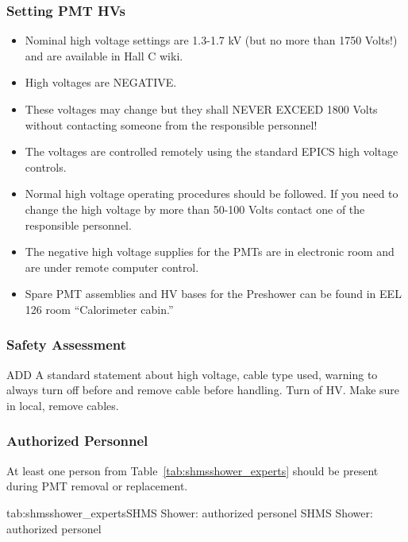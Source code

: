 {\subsubsection*{Setting PMT HVs}
\begin{itemize}
\item Nominal high voltage settings are 1.3-1.7 kV (but no more than
  1750 Volts!)  and are available in Hall C wiki.
\item High voltages are NEGATIVE. 
\item These voltages may change but they shall NEVER EXCEED 1800 Volts
  without contacting someone from the responsible personnel!
\item The voltages are controlled remotely using the standard EPICS high voltage controls.
\item Normal high voltage operating procedures should be followed. If
  you need to change the high voltage by more than 50-100 Volts
  contact one of the responsible personnel.
\item The negative high voltage supplies for the PMTs are in
  electronic room and are under remote computer control.
\item Spare PMT assemblies and HV bases for the Preshower can be
  found in EEL 126 room ``Calorimeter cabin.''
\end{itemize}

\begin{safetyen}{0}{0}

\subsubsection{Safety Assessment}

ADD A standard statement about high voltage, cable type used, warning
to always turn off before and remove cable before handling.  
Turn of HV.  Make sure in local, remove cables.


\subsubsection{Authorized Personnel}
At least one person from Table~\ref{tab:shmsshower_experts} should be
present during PMT removal or replacement.

\begin{namestab}{tab:shmsshower_experts}{SHMS Shower: authorized personel}{
    SHMS Shower: authorized personel}
  \ArshakAsaturyan{}
  \VardanTadevosyan{}
  \HamletMkrtchyan{}
  \ArthurMkrtchyan{}
\end{namestab}

\end{safetyen}

} %
